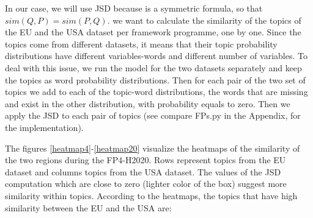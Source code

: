 \documentclass[12pt]{report}
\begin{document}
In our case, we will use JSD because is a symmetric
formula, so that $sim(Q,P) = sim(P,Q)$. we want to calculate the
similarity of the topics of the EU and the USA dataset per framework
programme, one by one. Since the topics come from different datasets,
it means that their topic probability distributions have different
variables-words and different number of variables. To deal with this
issue, we run the model for the two datasets separately and keep the
topics as word probability distributions. Then for each pair of the
two set of topics we add to each of the topic-word distributions, the
words that are missing and exist in the other distribution, with
probability equals to zero. Then we apply the JSD to each pair of
topics (see compare FPs.py in the Appendix, for the implementation).

The figures \ref{heatmap4}-\ref{heatmap20} visualize the heatmaps of
the similarity of the two regions during the FP4-H2020. Rows represent
topics from the EU dataset and columns topics from the USA dataset.
The values of the JSD computation which are close to zero (lighter
color of the box) suggest more similarity within topics. According to
the heatmaps, the topics that have high similarity between the EU and
the USA are: 
\end{document}
